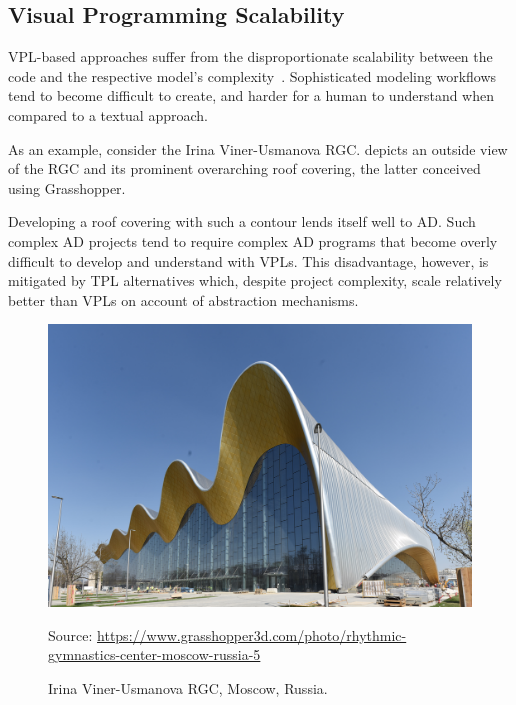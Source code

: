 \subsection{Visual Programming Scalability}%
\label{sec:related.ad.vpl-scalability}

\Ac{VPL}-based approaches suffer from the disproportionate scalability between
the code and the respective model's complexity~\cite{Leitao:2013:PESLGD}.
Sophisticated modeling workflows tend to become difficult to create, and harder
for a human to understand when compared to a textual approach.

As an example, consider the Irina Viner-Usmanova \ac{RGC}.
 depicts an outside view of the
\ac{RGC} and its prominent overarching roof covering, the latter conceived using
Grasshopper.

Developing a roof covering with such a contour lends itself well to \ac{AD}.
Such complex \ac{AD} projects tend to require complex \ac{AD} programs that
become overly difficult to develop and understand with \acp{VPL}.  This
disadvantage, however, is mitigated by \ac{TPL} alternatives which, despite
project complexity, scale relatively better than \acp{VPL} on account of
abstraction mechanisms.

\begin{figure}[htbp]
  \includegraphics[width=\linewidth]{fig/rgc}
  \begin{minipage}{\linewidth}
  \scriptsize Source:
  \url{https://www.grasshopper3d.com/photo/rhythmic-gymnastics-center-moscow-russia-5}
  \end{minipage}
  \caption{\label{fig:related.ad.vpl-scalability.rgc}
    Irina Viner-Usmanova \ac{RGC}, Moscow, Russia.}%
\end{figure}
